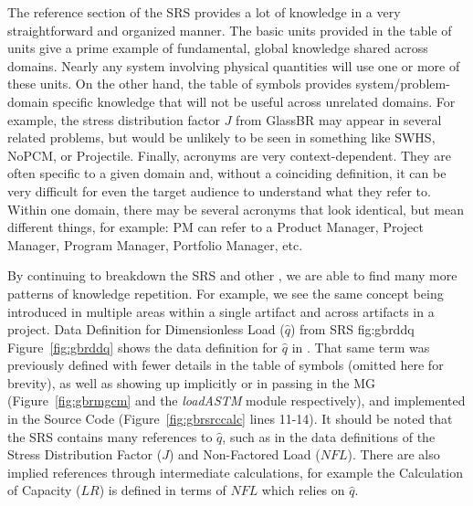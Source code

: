 The reference section of the SRS provides a lot of knowledge in a very 
straightforward and organized manner. The basic units provided in the table of 
units give a prime example of fundamental, global knowledge shared across 
domains. Nearly any system involving physical quantities will use one or more 
of these units. On the other hand, the table of symbols provides 
system/problem-domain specific knowledge that will not be useful across 
unrelated domains. For example, the stress distribution factor $J$ from GlassBR 
may appear in several related problems, but would be unlikely to be seen in 
something like SWHS, NoPCM, or Projectile. Finally, acronyms are very 
context-dependent. They are often specific to a given domain and, without a 
coinciding definition, it can be very difficult for even the target audience to 
understand what they refer to. Within one domain, there may be several acronyms 
that look identical, but mean different things, for example: PM can refer to a 
Product Manager, Project Manager, Program Manager, Portfolio Manager, etc.

By continuing to breakdown the SRS and other \sfs{}, we are able to find many 
more patterns of knowledge repetition. For example, we see the same concept 
being introduced in multiple areas within a single artifact and across 
artifacts in a project.
{Data Definition for Dimensionless Load ($\hat{q}$) from \gb{} SRS}
{fig:gbrddq}
Figure~\ref{fig:gbrddq} shows the data definition for $\hat{q}$ in \gb{}. That 
same term was previously defined with fewer details in the table of symbols 
(omitted here for brevity), as well as showing up implicitly or in passing 
in the MG (Figure~\ref{fig:gbrmgcm} and the \emph{loadASTM} module 
respectively), and implemented in the Source Code (Figure~\ref{fig:gbrsrccalc} 
lines 11-14). It should be noted that the SRS contains many references to 
$\hat{q}$, such as in the data definitions of the Stress Distribution Factor 
($J$) and Non-Factored Load ($NFL$). There are also implied references through 
intermediate calculations, for example the Calculation of Capacity ($LR$) is 
defined in terms of $NFL$ which relies on $\hat{q}$.

